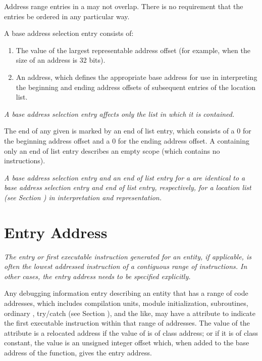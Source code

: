 Address range entries in
a  may not overlap.
There is no requirement that
the entries be ordered in any particular way.

A base address selection entry consists of:
\begin{enumerate}[1. ]
\item The value of the largest representable address offset (for example, \wffffffff when the size of
an address is 32 bits).

\item An address, which defines the appropriate base address for use in interpreting the beginning
and ending address offsets of subsequent entries of the location list.
\end{enumerate}
\textit{A base address selection entry 
affects only the list in which it is contained.}


The end of any given  is marked by an 
end of list entry, 
which consists of a 0 for the beginning address
offset and a 0 for the ending address offset. 
A 
containing only an end of list entry describes an empty scope
(which contains no instructions).

\textit{A base address selection entry and an 
end of list entry for
a  
are identical to a base address selection entry
and end of list entry, respectively, for a location list
(see Section ) 
in interpretation and representation.}



\section{Entry Address}
\label{chap:entryaddress}
\textit{The entry or first executable instruction generated
for an entity, if applicable, is often the lowest addressed
instruction of a contiguous range of instructions. In other
cases, the entry address needs to be specified explicitly.}

Any debugging information entry describing an entity that has
a range of code addresses, which includes compilation units,
module initialization, subroutines, 
ordinary , 
try/catch  (see Section 
),
and the like, may have a \DWATentrypcNAME{} attribute to
indicate the first executable instruction within that range
\hypertarget{chap:entryaddressofscope}{}
of addresses. The value of the \DWATentrypcNAME{} attribute is a
relocated address if the
value of \DWATentrypcNAME{} is of class address; or if it is of class
constant, the value is an unsigned integer offset which, when
added to the base address of the function, gives the entry
address. 

